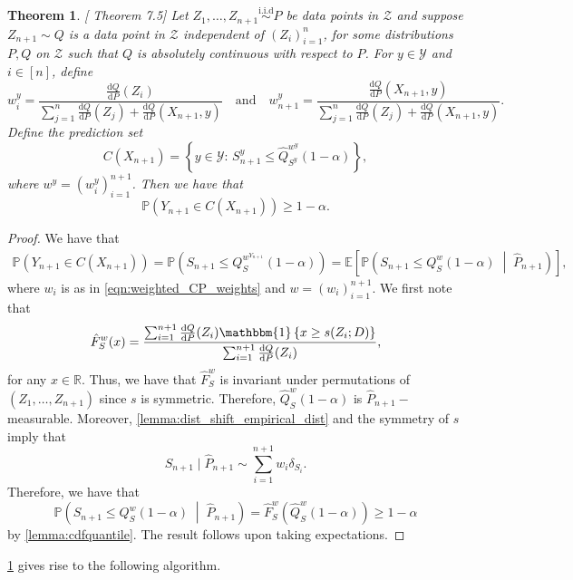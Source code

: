 \documentclass[11pt, titlepage]{article} %
\newcommand{\R}{\mathrm}
\newcommand{\Prob}[1]{\mathbb{P}\left( #1 \right)}
\newcommand{\Exp}[3]{\mathbb{E}\left#2 #1 \right#3}
\newcommand{\Ind}[1]{\mathbbm{1}\left\{ #1 \right\}}
\numberwithin{equation}{section}
\newtheorem{theorem}{Theorem}
\theoremstyle{definition}
\numberwithin{theorem}{section}
\numberwithin{lemma}{section}
\numberwithin{corollary}{section}
\numberwithin{proposition}{section}
\numberwithin{definition}{section}
\numberwithin{remark}{section}
\begin{document}
\begin{theorem}
\label{thm:dist_shift_coverage}[\cite{angelopoulos2024theoreticalfoundationsconformalprediction} Theorem 7.5]
    Let \(Z_1, \ldots, Z_{n+1} \overset{\R{i.i.d}}{\sim} P \) be data points in \(\mathcal{Z}\) and suppose \(Z_{n+1} \sim Q\) is a data point in \(\mathcal{Z}\) independent of \((Z_i)_{i=1}^n\), for some distributions \(P, Q\) on \(\mathcal{Z}\) such that \(Q\) is absolutely continuous with respect to \(P\). For \(y \in \mathcal{Y}\) and \(i \in [n]\), define \begin{equation}
        w_i^y = \frac{\frac{\R{d}Q}{\R{d}P}(Z_i)}{\sum_{j=1}^n \frac{\R{d}Q}{\R{d}P}(Z_j) + \frac{\R{d}Q}{\R{d}P}(X_{n+1}, y)} \quad \R{and} \quad w_{n+1}^y = \frac{\frac{\R{d}Q}{\R{d}P}(X_{n+1}, y)}{\sum_{j=1}^{n} \frac{\R{d}Q}{\R{d}P}(Z_j) + \frac{\R{d}Q}{\R{d}P}(X_{n+1}, y)}.
    \label{eqn:weighted_algorithm_weights}
    \end{equation} Define the prediction set \[
        C(X_{n+1}) = \left\{y \in \mathcal{Y} : \, S_{n+1}^y \leq \hat{Q}^{w^y}_{S^y}(1-\alpha) \right\},
    \] where \(w^y = (w_i^y)_{i=1}^{n+1}\). Then we have that \[\Prob{Y_{n+1} \in C(X_{n+1})} \geq 1-\alpha.\]
\end{theorem}
\begin{proof}
    We have that \begin{align*}
        \Prob{Y_{n+1} \in C(X_{n+1})} = \Prob{S_{n+1} \leq Q^{w^{Y_{n+1}}}_S(1-\alpha)} = \Exp{ \Prob{S_{n+1} \leq Q^{w}_S(1-\alpha) \;\middle\vert\;  \hat{P}_{n+1} }}{[}{]}, 
    \end{align*} where \(w_i\) is as in \cref{eqn:weighted_CP_weights} and \(w = (w_i)_{i=1}^{n+1}\). We first note that \[\hat{F}_S ^w (x) = \frac{\sum_{i=1}^{n+1} \frac{\R{d}Q}{\R{d}P}(Z_i) \Ind{x \geq s(Z_i; D)}}{\sum_{i=1}^{n+1} \frac{\R{d}Q}{\R{d}P}(Z_i)},\] for any \(x \in \mathbb{R}\). Thus, we have that \(\hat{F}_S^w\) is invariant under permutations of \((Z_1, \ldots, Z_{n+1})\) since \(s\) is symmetric. Therefore, \(\hat{Q}^w_S (1-\alpha)\) is \(\hat{P}_{n+1}-\)measurable. Moreover, \cref{lemma:dist_shift_empirical_dist} and the symmetry of \(s\) imply that \[S_{n+1} \; | \; \hat{P}_{n+1} \sim \sum_{i=1}^{n+1} w_i \delta_{S_i}.\] Therefore, we have that \[\Prob{S_{n+1} \leq Q^{w}_S(1-\alpha) \;\middle\vert\;  \hat{P}_{n+1} } = \hat{F}^w_S(\hat{Q}^w_S(1-\alpha)) \geq 1-\alpha\] by \cref{lemma:cdfquantile}. The result follows upon taking expectations.
\end{proof}

\noindent
\cref{thm:dist_shift_coverage} gives rise to the following algorithm.
\end{document}
